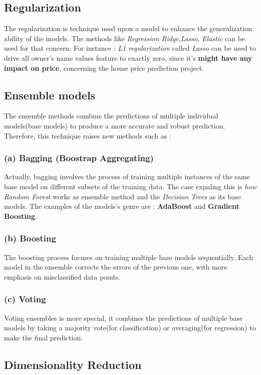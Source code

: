 \documentclass[12pt,a4paper]{report}
\begin{document}
\subsection*{Regularization} 
The regularization is technique used upon a model to enhance the generalization ability of the models. The methods like \textit{Regression Ridge},\textit{Lasso}, \textit{Elastic} can be used for that concern.  For instance :\textit{ L1 regularization} called \textit{Lasso} can be used to drive all  owner's name values feature to exactly zero, since it's \textbf{might have any impact on price}, concerning the house price prediction project.
\subsection*{Ensemble models}
The ensemble methods combine the predictions of multiple individual models(base models) to produce a more accurate and robust prediction. Therefore, this technique raises new methods such as :
\subsubsection{(a) Bagging (Boostrap Aggregating)} 
Actually, bagging involves the process of training multiple instances of the same base model on different subsets of the training data. The case expaling this is \textit{how Random Forest} works as ensemble method and the \textit{Decision Trees} as its base models. The examples of the models's genre are : \textbf{AdaBoost} and \textbf{Gradient Boosting}.
\subsubsection{ (b) Boosting} 
The boosting process focuses on training multiple base models sequentially. Each model in the ensemble corrects the errors of the previous one, with more emphasis on misclassified data points.

\subsubsection{(c) Voting} 
Voting ensembles is more special, it combines the predictions of multiple base models by taking a majority vote(for classification) or averaging(for regression) to make the final prediction. 
\subsection*{Dimensionality Reduction}
\end{document}
